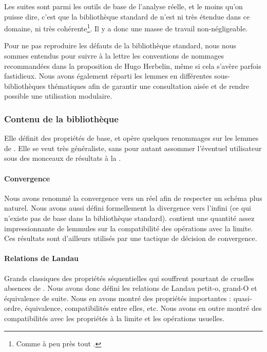 Les suites sont parmi les outils de base de l'analyse réelle, et le moins qu'on puisse dire, c'est que la bibliothèque standard de \Coq{} n'est ni très étendue dans ce domaine, ni très cohérente\footnote{Comme à peu près tout .}. Il y a donc une masse de travail non-négligeable.

Pour ne pas reproduire les défauts de la bibliothèque standard, nous nous sommes entendus pour suivre à la lettre les conventions de nommages recommandées dans la proposition de Hugo Herbelin\cite{naming_conventions}, même si cela s'avère parfois fastidieux. Nous avons également réparti les lemmes en différentes sous-bibliothèques thématiques afin de garantir une consultation aisée et de rendre possible une utilisation modulaire.

\subsubsection{Contenu de la bibliothèque}

Elle définit des propriétés de base, et opère quelques renommages sur les lemmes de . Elle se veut très généraliste, sans pour autant assommer l'éventuel utilisateur sous des monceaux de résultats à la .

\paragraph{Convergence} Nous avons renommé la convergence vers un réel afin de respecter un schéma plus naturel. Nous avons aussi défini formellement la divergence vers l'infini (ce qui n'existe pas de base dans la bibliothèque standard).  contient une quantité assez impressionnante de lemmules sur la compatibilité des opérations avec la limite. Ces résultats sont d'ailleurs utilisés par une tactique de décision de convergence.

\paragraph{Relations de Landau} Grands classiques des propriétés séquentielles qui souffrent pourtant de cruelles absences de . Nous avons donc défini les relations de Landau petit-o, grand-O et équivalence de suite. Nous en avons montré des propriétés importantes : quasi-ordre, équivalence, compatibilités entre elles, etc. Nous avons en outre montré des compatibilités avec les propriétés à la limite et les opérations usuelles.

